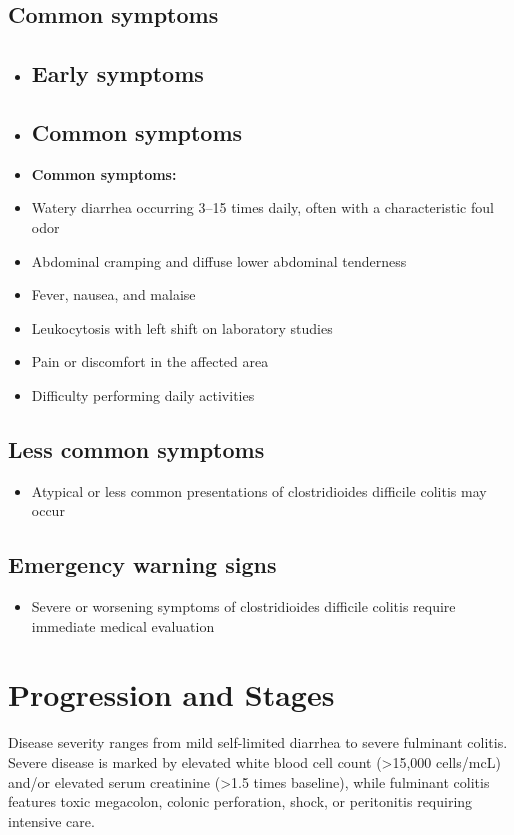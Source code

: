 \subsection{Common symptoms}
\begin{itemize}[noitemsep]
  \item \subsection{Early symptoms}
  \item \subsection{Common symptoms}
  \item \textbf{Common symptoms:}
  \item Watery diarrhea occurring 3--15 times daily, often with a characteristic foul odor
  \item Abdominal cramping and diffuse lower abdominal tenderness
  \item Fever, nausea, and malaise
  \item Leukocytosis with left shift on laboratory studies
  \item Pain or discomfort in the affected area
  \item Difficulty performing daily activities
\end{itemize}

\subsection{Less common symptoms}
\begin{itemize}[noitemsep]
  \item Atypical or less common presentations of clostridioides difficile colitis may occur
\end{itemize}

\subsection{Emergency warning signs}
\begin{itemize}[noitemsep]
  \item Severe or worsening symptoms of clostridioides difficile colitis require immediate medical evaluation
\end{itemize}
\section{Progression and Stages}
Disease severity ranges from mild self-limited diarrhea to severe fulminant colitis. Severe disease is marked by elevated white blood cell count (>15,000 cells/mcL) and/or elevated serum creatinine (>1.5 times baseline), while fulminant colitis features toxic megacolon, colonic perforation, shock, or peritonitis requiring intensive care.

